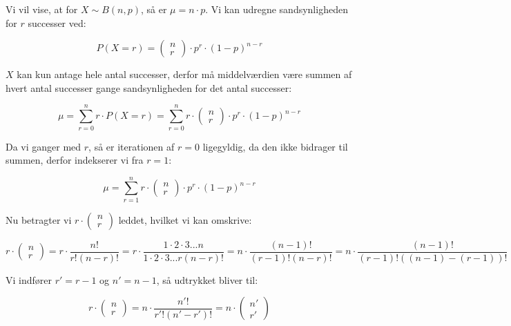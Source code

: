 \documentclass{article}
\makeatletter
\newenvironment{proofw}{\par
  \pushQED{\qed}%
  \normalfont \topsep6\p@\@plus6\p@\relax
  \trivlist
  \item[]\ignorespaces
}{%
  \popQED\endtrivlist\@endpefalse
}
\makeatother
\begin{document}
\begin{proofw}
    
Vi vil vise, at for $X \sim B(n,p)$, så er $\mu=n\cdot p$.
Vi kan udregne sandsynligheden for $r$ successer ved:

$$
    P(X=r)=\begin{pmatrix}
        n \\ r
    \end{pmatrix}
    \cdot p^r \cdot (1-p)^{n-r}
$$

$X$ kan kun antage hele antal successer, derfor må
middelværdien være summen af hvert antal successer gange sandsynligheden for det antal successer:

$$
\mu =\sum_{r=0}^{n} r\cdot P(X=r)=
\sum_{r=0}^{n} r \cdot \begin{pmatrix}
        n \\ r
    \end{pmatrix}
    \cdot p^r \cdot (1-p)^{n-r}
$$

Da vi ganger med $r$, så er iterationen af $r=0$ ligegyldig, da den ikke bidrager til summen,
derfor indekserer vi fra $r=1$:

$$
\mu =
\sum_{r=1}^{n} r \cdot \begin{pmatrix}
        n \\ r
    \end{pmatrix}
    \cdot p^r \cdot (1-p)^{n-r}
$$

Nu betragter vi $r \cdot \begin{pmatrix}
        n \\ r
    \end{pmatrix}$ leddet, hvilket vi kan omskrive:

$$
    r \cdot \begin{pmatrix}
        n \\ r
    \end{pmatrix}
    =
    r \cdot \frac{n!}{r!(n-r)!}
    =
    r \cdot \frac{1 \cdot 2 \cdot 3 ... n}{
        1 \cdot 2 \cdot 3...r(n-r)!
    }
    =n \cdot \frac{(n-1)!}{
        (r-1)!(n-r)!
    }
    =
    n \cdot \frac{(n-1)!}{
        (r-1)!((n-1)-(r-1))!
    }
$$

Vi indfører $r'=r-1$ og $n'=n-1$, så udtrykket bliver til:

$$
r \cdot \begin{pmatrix}
        n \\ r
    \end{pmatrix}
    =
    n \cdot \frac{n'!}{r'!(n'-r')!}
    =
    n \cdot \begin{pmatrix}
        n' \\ r'
    \end{pmatrix}
$$


\end{proofw}
\end{document}
